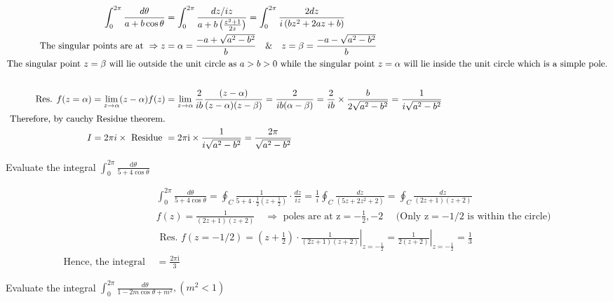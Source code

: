 \begin{answer}
	\begin{align*}
	\int_{0}^{2 \pi} \frac{d \theta}{a+b \cos \theta}&=\int_{0}^{2 \pi} \frac{d z / i z}{a+b\left(\frac{z^{2}+1}{2 z}\right)}=\int_{0}^{2 \pi} \frac{2 d z}{i\left(b z^{2}+2 a z+b\right)}\\
	\text { The singular points are at } \Rightarrow z&=\alpha=\frac{-a+\sqrt{a^{2}-b^{2}}}{b} \quad \& \quad z=\beta=\frac{-a-\sqrt{a^{2}-b^{2}}}{b}\\
	\intertext{The singular point $z=\beta$ will lie outside the unit circle as $a>b>0$ while the singular point $z=\alpha$ will lie inside the unit circle which is a simple pole.}\\
	\text { Res. } f(z=\alpha)=\lim _{z \rightarrow \alpha}(z-\alpha) f(z)&=\lim _{z \rightarrow \alpha} \frac{2}{i b} \frac{(z-\alpha)}{(z-\alpha)(z-\beta)}=\frac{2}{i b(\alpha-\beta)}=\frac{2}{i b} \times \frac{b}{2 \sqrt{a^{2}-b^{2}}}=\frac{1}{i \sqrt{a^{2}-b^{2}}}\\
\text { Therefore,  }\text{by cauchy Residue theorem.}&\\
I=2 \pi i \times \text { Residue }&=2 \pi \mathrm{i} \times \frac{1}{i \sqrt{a^{2}-b^{2}}}=\frac{2 \pi}{\sqrt{a^{2}-b^{2}}}
	\end{align*}
\end{answer}
\begin{exercise}
	Evaluate the integral $\int_{0}^{2 \pi} \frac{\mathrm{d} \theta}{5+4 \cos \theta}$
\end{exercise}
\begin{answer}
	\begin{align*}
	&\int_{0}^{2 \pi} \frac{d \theta}{5+4 \cos \theta}=\oint_{C} \frac{1}{5+4 \cdot \frac{1}{2}\left(z+\frac{1}{2}\right)} \cdot \frac{d z}{i z}=\frac{1}{i} \oint_{C} \frac{d z}{\left(5 z+2 z^{2}+2\right)}=\oint_{C} \frac{d z}{(2 z+1)(z+2)}\\
	&f(z)=\frac{1}{(2 z+1)(z+2)} \quad \Rightarrow \text { poles are at } \mathrm{z}=-\frac{1}{2},-2 \quad \text { (Only } \mathrm{z}=-1 / 2 \text { is within the circle) }\\
	&\text { Res. } f(z=-1 / 2)=\left.\left(z+\frac{1}{2}\right) \cdot \frac{1}{(2 z+1)(z+2)}\right|_{z=-\frac{1}{2}}=\left.\frac{1}{2(z+2)}\right|_{z=-\frac{1}{2}}=\frac{1}{3}\\
	\text { Hence, the integral }&=\frac{2 \pi \mathrm{i}}{3}
	\end{align*}
\end{answer}
\begin{exercise}
	Evaluate the integral $\int_{0}^{2 \pi} \frac{d \theta}{1-2 m \cos \theta+m^{2}},\left(m^{2}<1\right)$
\end{exercise}
